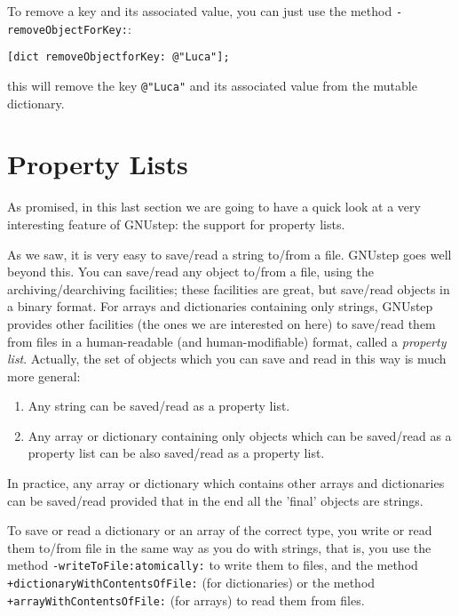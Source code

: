 \documentclass[a4paper]{article}
\begin{document}
To remove a key and its associated value, you can just use the method 
\texttt{-removeObjectForKey:}: 
\begin{verbatim}
[dict removeObjectforKey: @"Luca"]; 
\end{verbatim}
this will remove the key \texttt{@"Luca"} and its associated value 
from the mutable dictionary.

\section{Property Lists}
As promised, in this last section we are going to have a quick look at
a very interesting feature of GNUstep: the support for property lists.

As we saw, it is very easy to save/read a string to/from a file.
GNUstep goes well beyond this.  You can save/read any object to/from a
file, using the archiving/dearchiving facilities; these facilities are
great, but save/read objects in a binary format.  For arrays and
dictionaries containing only strings, GNUstep provides other
facilities (the ones we are interested on here) to save/read them from
files in a human-readable (and human-modifiable) format, called a
\emph{property list}.  Actually, the set of objects which you can save
and read in this way is much more general:
\begin{enumerate}
\item Any string can be saved/read as a property list.
\item Any array or dictionary containing only objects which can be
saved/read as a property list can be also saved/read as a property
list.
\end{enumerate}
In practice, any array or dictionary which contains other arrays and
dictionaries can be saved/read provided that in the end all the
'final' objects are strings.

To save or read a dictionary or an array of the correct type, you
write or read them to/from file in the same way as you do with
strings, that is, you use the method \texttt{-writeToFile:atomically:}
to write them to files, and the method
\texttt{+dictionaryWithContentsOfFile:} (for dictionaries) or
the method \texttt{+arrayWithContentsOfFile:} (for arrays) 
to read them from files.
\end{document}
